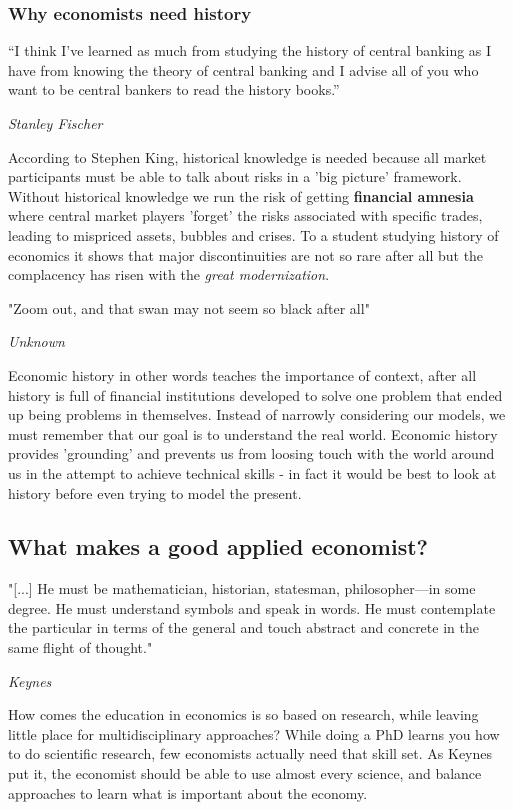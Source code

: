\documentclass[12pt, a4paper]{article}
\begin{document}
\begin{multicols}{2}
\subsubsection{Why economists need history}
\epigraph{“I think I’ve learned as much from studying the history of central banking as I have from knowing the theory of central banking and I advise all of you who want to be central bankers to read the history books.”}{\textit{Stanley Fischer}}
According to Stephen King, historical knowledge is needed because all market participants must be able to talk about risks in a 'big picture' framework. Without historical knowledge we run the risk of getting \textbf{financial amnesia} where central market players 'forget' the risks associated with specific trades, leading to mispriced assets, bubbles and crises. To a student studying history of economics it shows that major discontinuities are not so rare after all but the complacency has risen with the \textit{great modernization}.
\epigraph{"Zoom out, and that swan may not seem so black after all"}{\textit{Unknown}}
Economic history in other words teaches the importance of context, after all history is full of financial institutions developed to solve one problem that ended up being problems in themselves. Instead of narrowly considering our models, we must remember that our goal is to understand the real world. Economic history provides 'grounding' and prevents us from loosing touch with the world around us in the attempt to achieve technical skills - in fact it would be best to look at history before even trying to model the present.

\subsection{What makes a good applied economist?}
\epigraph{"[...] He must be mathematician, historian, statesman, philosopher—in some degree. He must understand symbols and speak in words. He must contemplate the particular in terms of the general and touch abstract and concrete in the same flight of thought."}{\textit{Keynes}}
How comes the education in economics is so based on research, while leaving little place for multidisciplinary approaches? While doing a PhD learns you how to do scientific research, few economists actually need that skill set. As Keynes put it, the economist should be able to use almost every science, and balance approaches to learn what is important about the economy.

\end{multicols}
\end{document}
